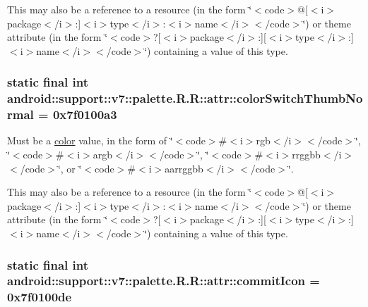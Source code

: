 This may also be a reference to a resource (in the form \char`\"{}$<$code$>$@\mbox{[}$<$i$>$package$<$/i$>$:\mbox{]}$<$i$>$type$<$/i$>$:$<$i$>$name$<$/i$>$$<$/code$>$\char`\"{}) or theme attribute (in the form \char`\"{}$<$code$>$?\mbox{[}$<$i$>$package$<$/i$>$:\mbox{]}\mbox{[}$<$i$>$type$<$/i$>$:\mbox{]}$<$i$>$name$<$/i$>$$<$/code$>$\char`\"{}) containing a value of this type. \hypertarget{classandroid_1_1support_1_1v7_1_1palette_1_1_r_1_1attr_5ae77e782587dc5dcdc9db499d3038b1}{
\subsubsection[{colorSwitchThumbNormal}]{\setlength{\rightskip}{0pt plus 5cm}static final int android::support::v7::palette.R.R::attr::colorSwitchThumbNormal = 0x7f0100a3}}
\label{classandroid_1_1support_1_1v7_1_1palette_1_1_r_1_1attr_5ae77e782587dc5dcdc9db499d3038b1}


Must be a \hyperlink{classandroid_1_1support_1_1v7_1_1palette_1_1_r_1_1color}{color} value, in the form of \char`\"{}$<$code$>$\#$<$i$>$rgb$<$/i$>$$<$/code$>$\char`\"{}, \char`\"{}$<$code$>$\#$<$i$>$argb$<$/i$>$$<$/code$>$\char`\"{}, \char`\"{}$<$code$>$\#$<$i$>$rrggbb$<$/i$>$$<$/code$>$\char`\"{}, or \char`\"{}$<$code$>$\#$<$i$>$aarrggbb$<$/i$>$$<$/code$>$\char`\"{}. 

This may also be a reference to a resource (in the form \char`\"{}$<$code$>$@\mbox{[}$<$i$>$package$<$/i$>$:\mbox{]}$<$i$>$type$<$/i$>$:$<$i$>$name$<$/i$>$$<$/code$>$\char`\"{}) or theme attribute (in the form \char`\"{}$<$code$>$?\mbox{[}$<$i$>$package$<$/i$>$:\mbox{]}\mbox{[}$<$i$>$type$<$/i$>$:\mbox{]}$<$i$>$name$<$/i$>$$<$/code$>$\char`\"{}) containing a value of this type. \hypertarget{classandroid_1_1support_1_1v7_1_1palette_1_1_r_1_1attr_68bb5c245171eb29912b4d3434e1969c}{
\subsubsection[{commitIcon}]{\setlength{\rightskip}{0pt plus 5cm}static final int android::support::v7::palette.R.R::attr::commitIcon = 0x7f0100de}}
\label{classandroid_1_1support_1_1v7_1_1palette_1_1_r_1_1attr_68bb5c245171eb29912b4d3434e1969c}


